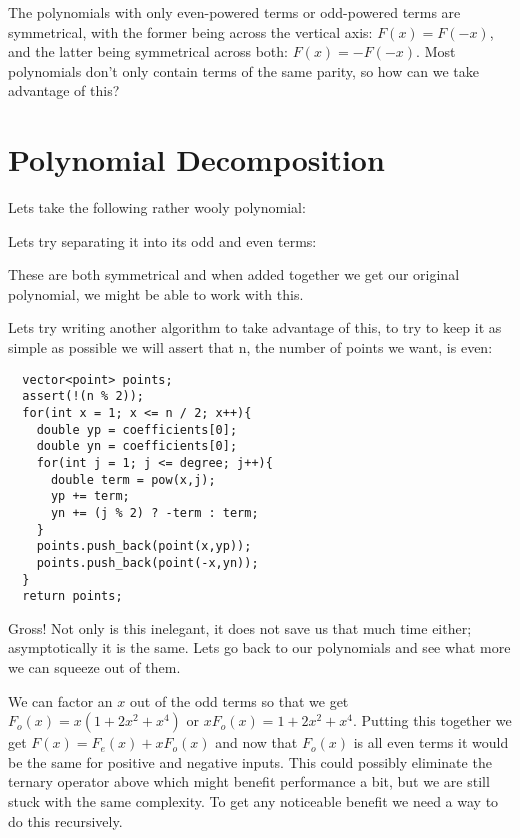 \documentclass[12pt]{article}
\begin{document}
The polynomials with only even-powered terms or odd-powered terms are symmetrical, with the former being across the vertical axis: $F(x) = F(-x)$, and the latter being symmetrical across both: $F(x) = -F(-x)$. Most polynomials don't only contain terms of the same parity, so how can we take advantage of this?

\pagebreak

\section{Polynomial Decomposition}

Lets take the following rather wooly polynomial:


Lets try separating it into its odd and even terms:

\begin{multicols}{2}
\end{multicols}

These are both symmetrical and when added together we get our original polynomial, we might be able to work with this.

\pagebreak

Lets try writing another algorithm to take advantage of this, to try to keep it as simple as possible we will assert that n, the number of points we want, is even:

\begin{lstlisting}
  vector<point> points;
  assert(!(n % 2));
  for(int x = 1; x <= n / 2; x++){
    double yp = coefficients[0];
    double yn = coefficients[0];
    for(int j = 1; j <= degree; j++){
      double term = pow(x,j);
      yp += term;
      yn += (j % 2) ? -term : term;
    }
    points.push_back(point(x,yp));
    points.push_back(point(-x,yn));
  }
  return points;
\end{lstlisting}

Gross! Not only is this inelegant, it does not save us that much time either; asymptotically it is the same. Lets go back to our polynomials and see what more we can squeeze out of them.

We can factor an $x$ out of the odd terms so that we get $F_o(x)=x(1+2x^2+x^4)$ or $x F_o(x)=1+2x^2+x^4$. Putting this together we get $F(x) = F_e(x) + xF_o(x)$ and now that $F_o(x)$ is all even terms it would be the same for positive and negative inputs. This could possibly eliminate the ternary operator above which might benefit performance a bit, but we are still stuck with the same complexity. To get any noticeable benefit we need a way to do this recursively.
\end{document}
